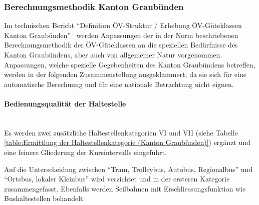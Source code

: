 \subsubsection{Berechnungsmethodik Kanton Graubünden}
\label{Lösungsansätze:Berechnungsmethodik Kanton Graubünden}
Im technischen Bericht "`Definition \acs{ÖV}-Struktur / Erhebung  \acs{ÖV}-Güteklassen Kanton Graubünden"'~\cite{oev-guteklasse-gr} werden Anpassungen der in der Norm beschriebenen Berechnungsmethodik der \acs{ÖV}-Güteklassen an die speziellen Bedürfnisse des Kanton Graubündens, aber auch von allgemeiner Natur vorgenommen.
Anpassungen, welche spezielle Gegebenheiten des Kanton Graubündens betreffen, werden in der folgenden Zusammenstellung ausgeklammert, da sie sich für eine automatische Berechnung und für eine nationale Betrachtung nicht eignen.

\paragraph{Bedienungsqualität der Haltestelle}~\\
\label{Berechnungsmethodik Kanton Graubünden:Bedienungsqualität der Haltestelle}
Es werden zwei zusätzliche Haltestellenkategorien VI und VII (siehe Tabelle \ref{table:Ermittlung der Haltestellenkategorie (Kanton Graubünden)}) ergänzt und eine feinere Gliederung der Kursintervalls eingeführt.

Auf die Unterscheidung zwischen "`Tram, Trolleybus, Autobus, Regionalbus"' und "`Ortsbus, lokaler Kleinbus"' wird verzichtet und in der ersteren Kategorie zusammengefasst.
Ebenfalls werden Seilbahnen mit Erschliessungsfunktion wie Bushaltestellen behandelt.

